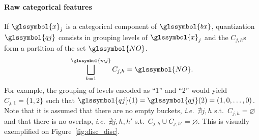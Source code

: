 \paragraph{Raw categorical features} If $\glssymbol{x}_j$ is a categorical component of $\glssymbol{bx}$, quantization $\glssymbol{qj}$ consists in grouping levels of $\glssymbol{x}_j$ and the $C_{j,h}$s form a partition of the set $\glssymbol{NO}$.
\begin{equation*}
\bigsqcup_{h=1}^{\glssymbol{mj}}C_{j,h}=\glssymbol{NO}.
\end{equation*}
For example, the grouping of levels encoded as ``1'' and ``2'' would yield $C_{j,1} = \{1,2\}$ such that $\glssymbol{qj}(1) = \glssymbol{qj}(2) = (1,0,\ldots,0)$. Note that it is assumed that there are no empty buckets, \textit{i.e.}\ $\nexists j, h$ s.t.\ $C_{j,h} = \varnothing$ and that there is no overlap, \textit{i.e.}\ $\nexists j,h,h'$ s.t.\ $C_{j,h} \cup C_{j,h'} = \varnothing$. This is visually exemplified on Figure~\ref{fig:disc_disc}.


